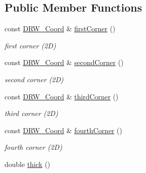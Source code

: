 \subsection*{Public Member Functions}
\begin{DoxyCompactItemize}
\item 
\hypertarget{class_d_r_w___solid_aceafc144bdb6f9debde7ef5220d527de}{}const \hyperlink{class_d_r_w___coord}{D\+R\+W\+\_\+\+Coord} \& \hyperlink{class_d_r_w___solid_aceafc144bdb6f9debde7ef5220d527de}{first\+Corner} ()\label{class_d_r_w___solid_aceafc144bdb6f9debde7ef5220d527de}

\begin{DoxyCompactList}\small\item\em first corner (2\+D) \end{DoxyCompactList}\item 
\hypertarget{class_d_r_w___solid_aa0122aff6219b5e49036aecd8da2857f}{}const \hyperlink{class_d_r_w___coord}{D\+R\+W\+\_\+\+Coord} \& \hyperlink{class_d_r_w___solid_aa0122aff6219b5e49036aecd8da2857f}{second\+Corner} ()\label{class_d_r_w___solid_aa0122aff6219b5e49036aecd8da2857f}

\begin{DoxyCompactList}\small\item\em second corner (2\+D) \end{DoxyCompactList}\item 
\hypertarget{class_d_r_w___solid_a54fa47c874ff49996fe94fb8c046f9dd}{}const \hyperlink{class_d_r_w___coord}{D\+R\+W\+\_\+\+Coord} \& \hyperlink{class_d_r_w___solid_a54fa47c874ff49996fe94fb8c046f9dd}{third\+Corner} ()\label{class_d_r_w___solid_a54fa47c874ff49996fe94fb8c046f9dd}

\begin{DoxyCompactList}\small\item\em third corner (2\+D) \end{DoxyCompactList}\item 
\hypertarget{class_d_r_w___solid_a22c02304f0275e38e29b2744681e3571}{}const \hyperlink{class_d_r_w___coord}{D\+R\+W\+\_\+\+Coord} \& \hyperlink{class_d_r_w___solid_a22c02304f0275e38e29b2744681e3571}{fourth\+Corner} ()\label{class_d_r_w___solid_a22c02304f0275e38e29b2744681e3571}

\begin{DoxyCompactList}\small\item\em fourth corner (2\+D) \end{DoxyCompactList}\item 
\hypertarget{class_d_r_w___solid_a1ab7f7398cddbded52c299f82daca0bf}{}double \hyperlink{class_d_r_w___solid_a1ab7f7398cddbded52c299f82daca0bf}{thick} ()\label{class_d_r_w___solid_a1ab7f7398cddbded52c299f82daca0bf}


\end{DoxyCompactItemize}
